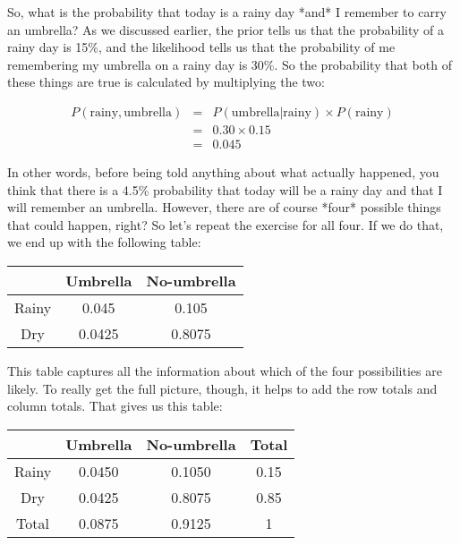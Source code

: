 So, what is the probability that today is a rainy day *and* I remember to carry an umbrella? As we discussed earlier, the prior tells us that the probability of a rainy day is 15\%, and the likelihood tells us that the probability of me remembering my umbrella on a rainy day is 30\%. So the probability that both of these things are true is calculated by multiplying the two:

\begin{eqnarray*}
P(\mbox{rainy}, \mbox{umbrella}) & = & P(\mbox{umbrella} | \mbox{rainy}) \times P(\mbox{rainy}) \\
& = & 0.30 \times 0.15 \\
& = & 0.045
\end{eqnarray*}


In other words, before being told anything about what actually happened, you think that there is a 4.5\% probability that today will be a rainy day and that I will remember an umbrella. However, there are of course *four* possible things that could happen, right? So let's repeat the exercise for all four. If we do that, we end up with the following table:

\begin{center}
\begin{tabular}{c|cc}
& Umbrella & No-umbrella \\ \hline
Rainy & 0.045 & 0.105 \\
Dry & 0.0425 & 0.8075
\end{tabular}
\end{center}


This table captures all the information about which of the four possibilities are likely. To really get the full picture, though, it helps to add the row totals and column totals. That gives us this table:

\begin{center}
\begin{tabular}{c|cc|c}
& Umbrella & No-umbrella & Total \\ \hline
Rainy & 0.0450 & 0.1050 & 0.15 \\
Dry & 0.0425 & 0.8075  & 0.85 \\ \hline
Total & 0.0875 & 0.9125 & 1
\end{tabular}
\end{center}


